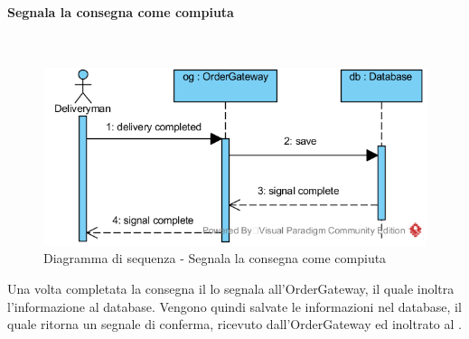 \begin{samepage}
\paragraph{Segnala la consegna come compiuta}\mbox{}\\
\end{samepage}
\begin{figure}[H]
	\centering
	\includegraphics[width=14cm]{../../documenti/SpecificaTecnica/diagrammi_img/sequenza/fattorino_segnala_consegna_completata.png}
	\caption{Diagramma di sequenza - Segnala la consegna come compiuta}
\end{figure}
Una volta completata la consegna il \Deliveryman{} lo segnala all'Order\-Gateway, il quale inoltra l'informazione al database. Vengono quindi salvate le informazioni nel database, il quale ritorna un segnale di conferma, ricevuto dall'Order\-Gateway ed inoltrato al \Deliveryman{}.

